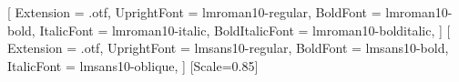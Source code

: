 \usepackage{fontspec}
\setmainfont{Latin Modern Roman}[
  Extension = .otf,
  UprightFont = lmroman10-regular,
  BoldFont = lmroman10-bold,
  ItalicFont = lmroman10-italic,
  BoldItalicFont = lmroman10-bolditalic,
]
\setsansfont{Latin Modern Sans}[
  Extension = .otf,
  UprightFont = lmsans10-regular,
  BoldFont = lmsans10-bold,
  ItalicFont = lmsans10-oblique,
]
\setmonofont{DejaVu Sans Mono}[Scale=0.85]

\newfontfamily{}

\usepackage{newunicodechar}

